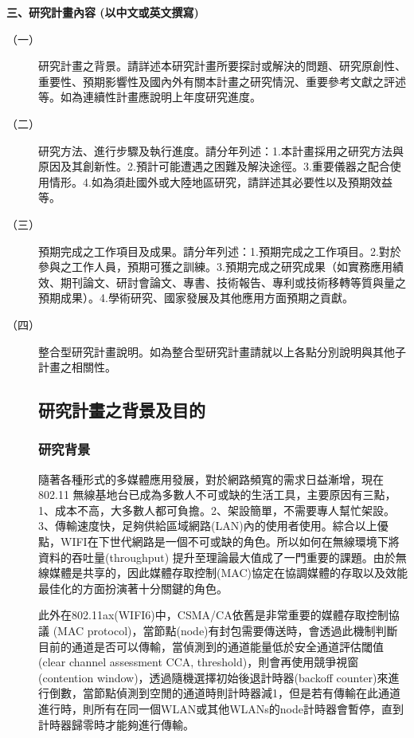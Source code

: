 \documentclass[12pt,a4paper]{article}
\begin{document}
\newtheorem{thm}{Theorem}
\newtheorem{lem}{Lemma}
\newtheorem{cor}{Corollary}
\newtheorem{prop}{Proposition}
\newtheorem{conj}{Conjecture}

\baselineskip 7mm

\noindent
\textbf{\large 三、研究計畫內容 (以中文或英文撰寫)}
\begin{description}
\item[（一）]研究計畫之背景。請詳述本研究計畫所要探討或解決的問題、研究原創性、重要性、預期影響性及國內外有關本計畫之研究情況、重要參考文獻之評述等。如為連續性計畫應說明上年度研究進度。
\item[（二）]研究方法、進行步驟及執行進度。請分年列述：1.本計畫採用之研究方法與原因及其創新性。2.預計可能遭遇之困難及解決途徑。3.重要儀器之配合使用情形。4.如為須赴國外或大陸地區研究，請詳述其必要性以及預期效益等。
\item[（三）]預期完成之工作項目及成果。請分年列述：1.預期完成之工作項目。2.對於參與之工作人員，預期可獲之訓練。3.預期完成之研究成果（如實務應用績效、期刊論文、研討會論文、專書、技術報告、專利或技術移轉等質與量之預期成果）。4.學術研究、國家發展及其他應用方面預期之貢獻。
\item[（四）]整合型研究計畫說明。如為整合型研究計畫請就以上各點分別說明與其他子計畫之相關性。

\setlength\parindent{2em}    %

\setcounter{section}{3}
\setcounter{subsection}{0}

\subsection{研究計畫之背景及目的}
\subsubsection{研究背景}%
隨著各種形式的多媒體應用發展，對於網路頻寬的需求日益漸增，現在802.11 無線基地台已成為多數人不可或缺的生活工具，主要原因有三點，1、成本不高，大多數人都可負擔。2、架設簡單，不需要專人幫忙架設。3、傳輸速度快，足夠供給區域網路(LAN)內的使用者使用。綜合以上優點，WIFI在下世代網路是一個不可或缺的角色。所以如何在無線環境下將資料的吞吐量(throughput) 提升至理論最大值成了一門重要的課題。由於無線媒體是共享的，因此媒體存取控制(MAC)協定在協調媒體的存取以及效能最佳化的方面扮演著十分關鍵的角色。

此外\cite{31}在802.11ax(WIFI6)中，CSMA/CA依舊是非常重要的媒體存取控制協議 (MAC protocol)，當節點(node)有封包需要傳送時，會透過此機制判斷目前的通道是否可以傳輸，當偵測到的通道能量低於安全通道評估閾值(clear channel assessment CCA, threshold)，則會再使用競爭視窗(contention window)，透過隨機選擇初始後退計時器(backoff counter)來進行倒數，當節點偵測到空閒的通道時則計時器減1，但是若有傳輸在此通道進行時，則所有在同一個WLAN或其他WLANs的node計時器會暫停，直到計時器歸零時才能夠進行傳輸。


\end{description}
\end{document}
